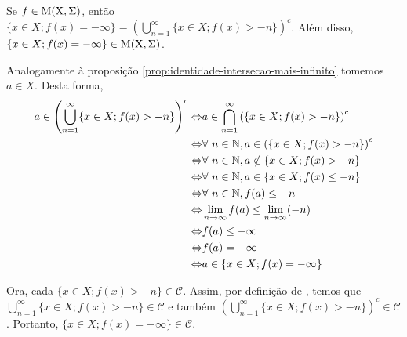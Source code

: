     \begin{proposition}
    \label{prop:identidade-união-menos-infinito}
        Se $f \in \operatorname{M(X, \Sigma)}$, então $\{x \in X; f(x) = -\infty\} = \displaystyle \left(\bigcup_{n = 1}^\infty \{x \in X; f(x) > - n\}\right)^c$.
        Além disso, $\{x \in X; f(x) = -\infty\} \in \operatorname{M(X, \Sigma)}$.
    \end{proposition}

    \begin{prova}
        Analogamente à proposição \ref{prop:identidade-intersecao-mais-infinito} tomemos $a \in X$. 
        Desta forma, 
        \begin{align*}
            a \in \left(\bigcup_{n = 1}^\infty \{x \in X; f(x) > - n\}\right)^c
            \Leftrightarrow & a \in \bigcap_{n = 1}^\infty \left(\{x \in X; f(x) > - n\}\right)^c\\
            \Leftrightarrow & \forall \ n \in \operatorname{\mathbb{N}}, a \in \left(\{x \in X; f(x) > - n\}\right)^c\\
            \Leftrightarrow & \forall \ n \in \operatorname{\mathbb{N}}, a \notin \{x \in X; f(x) > - n\}\\
            \Leftrightarrow & \forall \ n \in \operatorname{\mathbb{N}}, a \in \{x \in X; f(x) \leq - n\}\\
            \Leftrightarrow & \forall \ n \in \operatorname{\mathbb{N}}, f(a) \leq - n\\
            \Leftrightarrow & \lim_{n \to \infty} f(a) \leq \lim_{n \to \infty} (- n)\\            
            \Leftrightarrow & f(a) \leq -\infty\\            
            \Leftrightarrow & f(a) = -\infty\\            
            \Leftrightarrow & a \in \{x \in X; f(x) = -\infty\}            
        \end{align*}
        
    Ora, cada $\{x \in X; f(x) > - n\} \in \mathcal{C}$.
    Assim, por definição de \sigal, temos que $\bigcup_{n = 1}^\infty \{x \in X; f(x) > - n\} \in \mathcal{C}$ e também 
    $\left(\bigcup_{n = 1}^\infty \{x \in X; f(x) > - n\}\right)^c \in \mathcal{C}$.
    Portanto, $\{x \in X; f(x) = -\infty\} \in \mathcal{C}$. 
    \end{prova}

